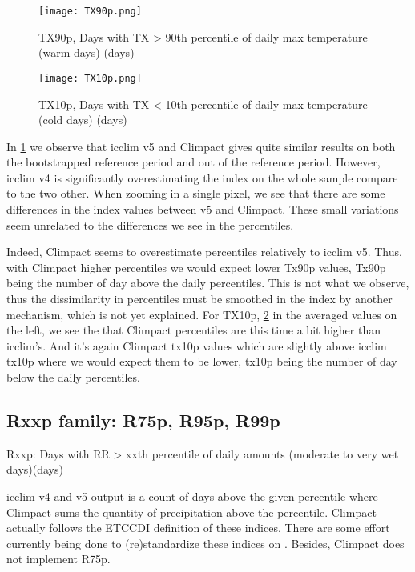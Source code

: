 \documentclass[a4paper,11pt]{article}
\begin{document}
            \begin{figure}[h]
                \centering
                \texttt{[image: TX90p.png]}
                \caption{TX90p, Days with TX > 90th percentile of daily max temperature (warm days) (days)}
                \label{figure/tx90p}
            \end{figure}

            \begin{figure}[h]
                \centering
                \texttt{[image: TX10p.png]}
                \caption{TX10p, Days with TX < 10th percentile of daily max temperature (cold days) (days)}
                \label{figure/tx10p}
            \end{figure}

            In \ref{figure/tx90p} we observe that icclim v5 and Climpact gives quite similar results on both the bootstrapped reference period and out of the reference period.
            However, icclim v4 is significantly overestimating the index on the whole sample compare to the two other.
            When zooming in a single pixel, we see that there are some differences in the index values between v5 and Climpact.
            These small variations seem unrelated to the differences we see in the percentiles.

            Indeed, Climpact seems to overestimate percentiles relatively to icclim v5. Thus, with Climpact higher percentiles we would expect lower Tx90p values, Tx90p being the number of day above the daily percentiles.
            This is not what we observe, thus the dissimilarity in percentiles must be smoothed in the index by another mechanism, which is not yet explained.
            For TX10p, \ref{figure/tx10p} in the averaged values on the left, we see the that Climpact percentiles are this time a bit higher than icclim's.
            And it's again Climpact tx10p values which are slightly above icclim tx10p where we would expect them to be lower, tx10p being the number of day below the daily percentiles.

        \subsection{Rxxp family: R75p, R95p, R99p}
            Rxxp: Days with RR > xxth percentile of daily amounts (moderate to very wet days)(days)

            icclim v4 and v5 output is a count of days above the given percentile where Climpact sums the quantity of precipitation above the percentile. 
            Climpact actually follows the ETCCDI \cite{doc/etccdi} definition of these indices.
            There are some effort currently being done to (re)standardize these indices on \cite{gh/clixmeta}.
            Besides, Climpact does not implement R75p.
\end{document}
